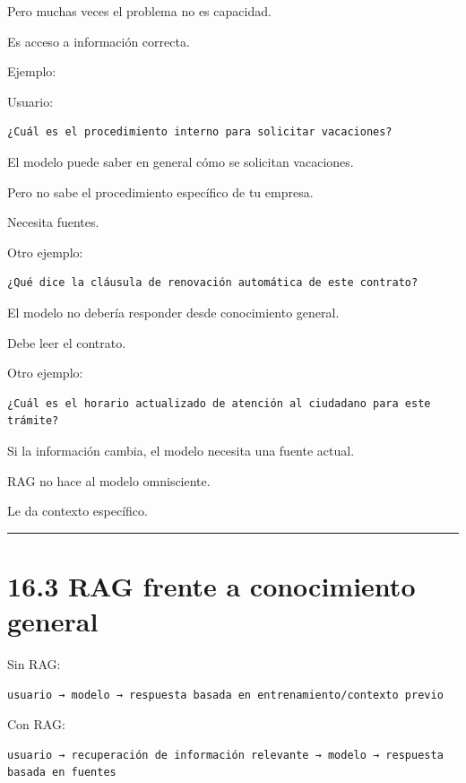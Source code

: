 Pero muchas veces el problema no es capacidad.

Es acceso a información correcta.

Ejemplo:

Usuario:

\begin{lstlisting}
¿Cuál es el procedimiento interno para solicitar vacaciones?
\end{lstlisting}

El modelo puede saber en general cómo se solicitan vacaciones.

Pero no sabe el procedimiento específico de tu empresa.

Necesita fuentes.

Otro ejemplo:

\begin{lstlisting}
¿Qué dice la cláusula de renovación automática de este contrato?
\end{lstlisting}

El modelo no debería responder desde conocimiento general.

Debe leer el contrato.

Otro ejemplo:

\begin{lstlisting}
¿Cuál es el horario actualizado de atención al ciudadano para este trámite?
\end{lstlisting}

Si la información cambia, el modelo necesita una fuente actual.

RAG no hace al modelo omnisciente.

Le da contexto específico.

\begin{center}\rule{0.5\linewidth}{0.5pt}\end{center}

\section{16.3 RAG frente a conocimiento
general}\label{rag-frente-a-conocimiento-general}

Sin RAG:

\begin{lstlisting}
usuario → modelo → respuesta basada en entrenamiento/contexto previo
\end{lstlisting}

Con RAG:

\begin{lstlisting}
usuario → recuperación de información relevante → modelo → respuesta basada en fuentes
\end{lstlisting}

